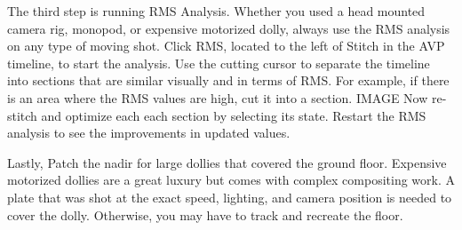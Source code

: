 \begin{fullwidth}
The third step is running RMS Analysis. Whether you used a head mounted camera rig, monopod, or expensive motorized dolly, always use the RMS analysis on any type of moving shot. Click RMS, located to the left of Stitch in the AVP timeline, to start the analysis. Use the cutting cursor to separate the timeline into sections that are similar visually and in terms of RMS. For example, if there is an area where the RMS values are high, cut it into a section. IMAGE Now re-stitch and optimize each each section by selecting its state. Restart the RMS analysis to see the improvements in updated values.

Lastly, Patch the nadir for large dollies that covered the ground floor. Expensive motorized dollies are a great luxury but comes with complex compositing work. A plate that was shot at the exact speed, lighting, and camera position is needed to cover the dolly. Otherwise, you may have to track and recreate the floor.


\clearpage
\end{fullwidth}